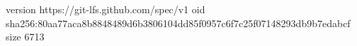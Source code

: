 version https://git-lfs.github.com/spec/v1
oid sha256:80aa77aca8b8848489d6b3806104dd85f0957c6f7c25f07148293db9b7edabcf
size 6713
